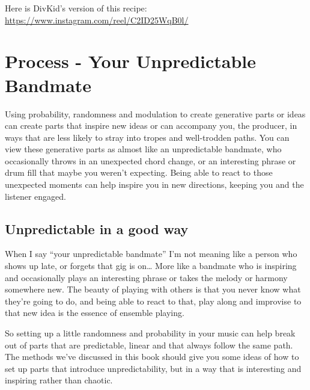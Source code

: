 \documentclass[
  12pt,
  letterpaper,
  oneside,
  open=any]{scrbook}
\begin{document}
Here is DivKid's version of this recipe:
\url{https://www.instagram.com/reel/C2ID25WqB0l/}


\chapter{Process - Your Unpredictable
Bandmate}\label{Chapter-023-Process-Your_Unpredictable_Bandmate}

\begin{tcolorbox}[enhanced jigsaw, arc=.35mm, title=\textcolor{quarto-callout-tip-color}{\faLightbulb}\hspace{0.5em}{Key idea}, colback=white, opacitybacktitle=0.6, coltitle=black, toptitle=1mm, colframe=quarto-callout-tip-color-frame, bottomtitle=1mm, titlerule=0mm, rightrule=.15mm, bottomrule=.15mm, colbacktitle=quarto-callout-tip-color!10!white, toprule=.15mm, breakable, opacityback=0, left=2mm, leftrule=.75mm]

Using probability, randomness and modulation to create generative parts
or ideas can create parts that inspire new ideas or can accompany you,
the producer, in ways that are less likely to stray into tropes and
well-trodden paths. You can view these generative parts as almost like
an unpredictable bandmate, who occasionally throws in an unexpected
chord change, or an interesting phrase or drum fill that maybe you
weren't expecting. Being able to react to those unexpected moments can
help inspire you in new directions, keeping you and the listener
engaged.

\end{tcolorbox}

\section{Unpredictable in a good way}\label{unpredictable-in-a-good-way}

When I say ``your unpredictable bandmate'' I'm not meaning like a person
who shows up late, or forgets that gig is on\ldots{} More like a
bandmate who is inspiring and occasionally plays an interesting phrase
or takes the melody or harmony somewhere new. The beauty of playing with
others is that you never know what they're going to do, and being able
to react to that, play along and improvise to that new idea is the
essence of ensemble playing.

So setting up a little randomness and probability in your music can help
break out of parts that are predictable, linear and that always follow
the same path. The methods we've discussed in this book should give you
some ideas of how to set up parts that introduce unpredictability, but
in a way that is interesting and inspiring rather than chaotic.
\end{document}
